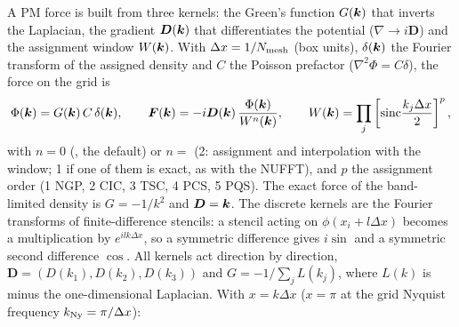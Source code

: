 A PM force is built from three kernels: the Green's function $G(\bm{k})$ that inverts the Laplacian, the gradient
$\bm D(\bm{k})$ that differentiates the potential ($\nabla\to i\bm D$) and the assignment window $W(\bm{k})$. With
$\Delta x=1/N_{\rm mesh}$ (box units), $\delta(\bm{k})$ the Fourier transform of the assigned density and $C$ the Poisson
prefactor ($\nabla^2\Phi=C\delta$), the force on the grid is
\begin{equation}\label{eq:nbody-force-kernels}
\Phi(\bm{k})=G(\bm{k})\,C\,\delta(\bm{k}),\qquad
\bm F(\bm{k})=-i\bm D(\bm{k})\,\frac{\Phi(\bm{k})}{W^{n}(\bm{k})},\qquad
W(\bm{k})=\prod_{j}\left[\mathrm{sinc}\frac{k_j\Delta x}{2}\right]^{p},
\end{equation}
with $n=0$ (, the default) or $n=$  (2: assignment and
interpolation with the window; 1 if one of them is exact, as with the NUFFT), and $p$ the assignment order
(1 NGP, 2 CIC, 3 TSC, 4 PCS, 5 PQS). The exact force of the band-limited density is $G=-1/k^2$ and $\bm D=\bm{k}$. The
discrete kernels are the Fourier transforms of finite-difference stencils: a stencil acting on $\phi(x_i+l\Delta x)$
becomes a multiplication by $e^{ilk\Delta x}$, so a symmetric difference gives $i\sin$ and a symmetric second difference
$\cos$. All kernels act direction by direction, $\bm D=(D(k_1),D(k_2),D(k_3))$ and
$G=-1/\sum_jL(k_j)$, where $L(k)$ is minus the one-dimensional Laplacian. With $x=k\Delta x$ ($x=\pi$ at the
grid Nyquist frequency $k_{\rm Ny}=\pi/\Delta x$):

